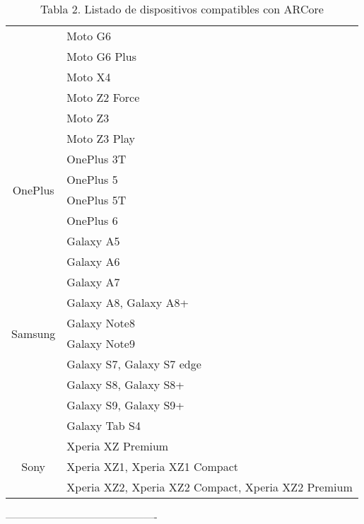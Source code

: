 \begin{table}[]
\begin{tabular}{|c|l|}
		& Moto G6                                            \\ \cline{2-2} 
		& Moto G6 Plus                                       \\ \cline{2-2} 
		& Moto X4                                            \\ \cline{2-2} 
		& Moto Z2 Force                                      \\ \cline{2-2} 
		& Moto Z3                                            \\ \cline{2-2} 
		& Moto Z3 Play                                       \\ \hline
		\multirow{4}{*}{OnePlus}    & OnePlus 3T                                         \\ \cline{2-2} 
		& OnePlus 5                                          \\ \cline{2-2} 
		& OnePlus 5T                                         \\ \cline{2-2} 
		& OnePlus 6                                          \\ \hline
		\multirow{10}{*}{Samsung}   & Galaxy A5                                          \\ \cline{2-2} 
		& Galaxy A6                                          \\ \cline{2-2} 
		& Galaxy A7                                          \\ \cline{2-2} 
		& Galaxy A8, Galaxy A8+                              \\ \cline{2-2} 
		& Galaxy Note8                                       \\ \cline{2-2} 
		& Galaxy Note9                                       \\ \cline{2-2} 
		& Galaxy S7, Galaxy S7 edge                          \\ \cline{2-2} 
		& Galaxy S8, Galaxy S8+                              \\ \cline{2-2} 
		& Galaxy S9, Galaxy S9+                              \\ \cline{2-2} 
		& Galaxy Tab S4                                      \\ \hline
		\multirow{3}{*}{Sony}       & Xperia XZ Premium                                  \\ \cline{2-2} 
		& Xperia XZ1, Xperia XZ1 Compact                     \\ \cline{2-2} 
		& Xperia XZ2, Xperia XZ2 Compact, Xperia XZ2 Premium \\ \hline
	\end{tabular}

\captionsetup{justification=centering}
\caption*{Tabla 2. Listado de dispositivos compatibles con ARCore}
\end{table}


----------------------------------------------